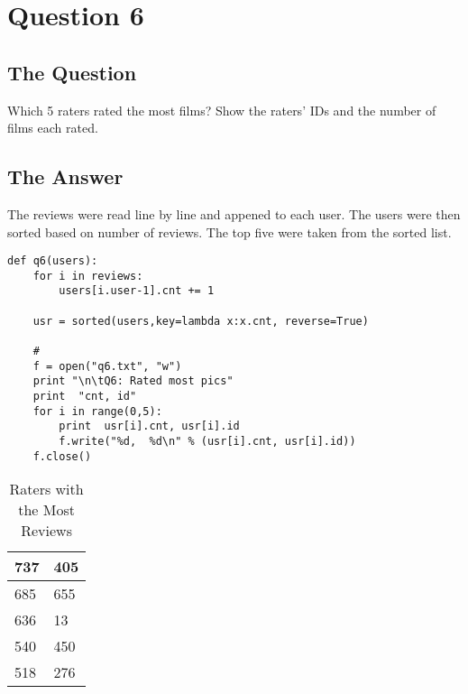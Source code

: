 \section{Question 6}

\subsection{The Question}

\begin{flushleft}

Which 5 raters rated the most films? Show the raters' IDs and
the number of films each rated.

\end{flushleft}
\subsection{The Answer}

The reviews were read line by line and appened to each user. The users were then sorted based on number of reviews. The top five were taken from the sorted list. 


\begin{lstlisting}[caption={Python code for question 6}]
def q6(users):
	for i in reviews:
		users[i.user-1].cnt += 1

	usr = sorted(users,key=lambda x:x.cnt, reverse=True)

	# 
	f = open("q6.txt", "w")
	print "\n\tQ6: Rated most pics"
	print  "cnt, id"
	for i in range(0,5):
		print  usr[i].cnt, usr[i].id
		f.write("%d,  %d\n" % (usr[i].cnt, usr[i].id))
	f.close()
\end{lstlisting}


\begin{flushleft}


\begin{table}[h]
\setlength{\tabcolsep}{12pt}
\centering
\begin{tabular}{|ll|}
\hline
737 & 405 \\ \hline
685 & 655 \\ \hline
636 & 13  \\ \hline
540 & 450 \\ \hline
518 & 276 \\ \hline
\end{tabular}
\caption{Raters with the Most Reviews}
\end{table}


\end{flushleft}




